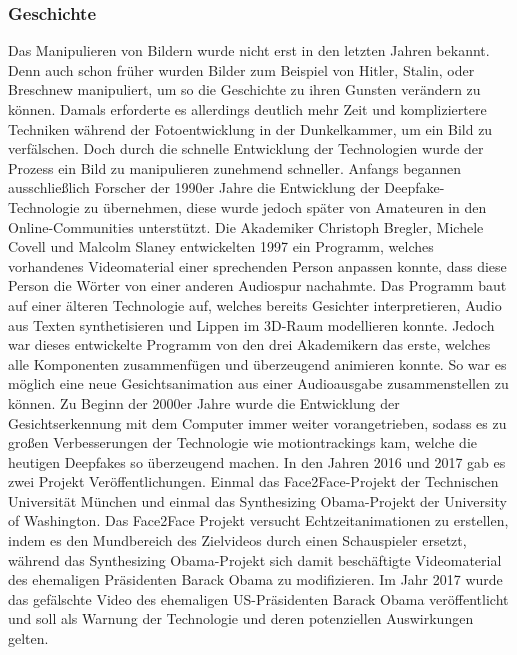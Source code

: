 \subsubsection*{Geschichte}
Das Manipulieren von Bildern wurde nicht erst in den letzten Jahren bekannt. Denn auch schon früher wurden Bilder zum Beispiel von Hitler, Stalin, oder Breschnew manipuliert, um so die Geschichte zu ihren Gunsten verändern zu können.
Damals erforderte es allerdings deutlich mehr Zeit und kompliziertere Techniken während der Fotoentwicklung in der Dunkelkammer, um ein Bild zu verfälschen. Doch durch die schnelle Entwicklung der Technologien wurde der Prozess ein Bild zu manipulieren zunehmend schneller.
Anfangs begannen ausschließlich Forscher der 1990er Jahre die Entwicklung der Deepfake-Technologie zu übernehmen, diese wurde jedoch später von Amateuren in den Online-Communities unterstützt.
Die Akademiker Christoph Bregler, Michele Covell und Malcolm Slaney entwickelten 1997 ein Programm, welches vorhandenes Videomaterial einer sprechenden Person anpassen konnte, dass diese Person die Wörter von einer anderen Audiospur nachahmte.
Das Programm baut auf einer älteren Technologie auf, welches bereits Gesichter interpretieren, Audio aus Texten synthetisieren und Lippen im 3D-Raum modellieren konnte.
Jedoch war dieses entwickelte Programm von den drei Akademikern das erste, welches alle Komponenten zusammenfügen und überzeugend animieren konnte. So war es möglich eine neue Gesichtsanimation aus einer Audioausgabe zusammenstellen zu können.\newline
Zu Beginn der 2000er Jahre wurde die Entwicklung der Gesichtserkennung mit dem Computer immer weiter vorangetrieben,
sodass es zu großen Verbesserungen der Technologie wie \glspl{motiontracking} kam, welche die heutigen Deepfakes so
überzeugend machen.\newline
In den Jahren 2016 und 2017 gab es zwei Projekt Veröffentlichungen. Einmal das Face2Face-Projekt der Technischen Universität München und einmal das Synthesizing Obama-Projekt der University of Washington. \newline
Das Face2Face Projekt versucht Echtzeitanimationen zu erstellen, indem es den Mundbereich des Zielvideos durch einen Schauspieler ersetzt, während das Synthesizing Obama-Projekt sich damit beschäftigte Videomaterial des ehemaligen Präsidenten Barack Obama zu modifizieren.\cite{ResearchGate}\newline
Im Jahr 2017 wurde das gefälschte Video des ehemaligen US-Präsidenten Barack Obama veröffentlicht und soll als Warnung der Technologie und deren potenziellen Auswirkungen gelten.
